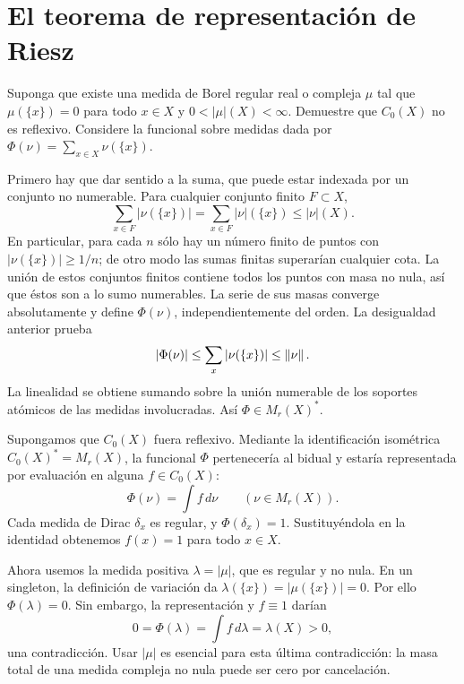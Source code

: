 \chapter{El teorema de representación de Riesz}

\begin{ejercicio}\label{ej:v2-l33-1}
Suponga que existe una medida de Borel regular real o compleja $\mu$ tal que $\mu(\{x\})=0$ para todo $x\in X$ y $0<|\mu|(X)<\infty$. Demuestre que $C_0(X)$ no es reflexivo. Considere la funcional sobre medidas dada por $\Phi(\nu)=\sum_{x\in X}\nu(\{x\})$.
\end{ejercicio}
\begin{solucion}
Primero hay que dar sentido a la suma, que puede estar indexada por un conjunto no numerable. Para cualquier conjunto finito $F\subset X$,
\[
 \sum_{x\in F}|\nu(\{x\})|=\sum_{x\in F}|\nu|(\{x\})\le|\nu|(X).
\]
En particular, para cada $n$ sólo hay un número finito de puntos con $|\nu(\{x\})|\ge1/n$; de otro modo las sumas finitas superarían cualquier cota. La unión de estos conjuntos finitos contiene todos los puntos con masa no nula, así que éstos son a lo sumo numerables. La serie de sus masas converge absolutamente y define $\Phi(\nu)$, independientemente del orden. La desigualdad anterior prueba
\[
 |\Phi(\nu)|\le\sum_x|\nu(\{x\})|\le\left\lVert\nu\right\rVert.
\]
La linealidad se obtiene sumando sobre la unión numerable de los soportes atómicos de las medidas involucradas. Así $\Phi\in M_r(X)^*$.

Supongamos que $C_0(X)$ fuera reflexivo. Mediante la identificación isométrica $C_0(X)^*=M_r(X)$, la funcional $\Phi$ pertenecería al bidual y estaría representada por evaluación en alguna $f\in C_0(X)$:
\[
 \Phi(\nu)=\int f\,d\nu\qquad(\nu\in M_r(X)).
\]
Cada medida de Dirac $\delta_x$ es regular, y $\Phi(\delta_x)=1$. Sustituyéndola en la identidad obtenemos $f(x)=1$ para todo $x\in X$.

Ahora usemos la medida positiva $\lambda=|\mu|$, que es regular y no nula. En un singleton, la definición de variación da $\lambda(\{x\})=|\mu(\{x\})|=0$. Por ello $\Phi(\lambda)=0$. Sin embargo, la representación y $f\equiv1$ darían
\[
 0=\Phi(\lambda)=\int f\,d\lambda=\lambda(X)>0,
\]
una contradicción. Usar $|\mu|$ es esencial para esta última contradicción: la masa total de una medida compleja no nula puede ser cero por cancelación.
\end{solucion}
